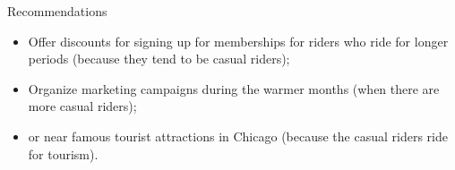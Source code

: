 \documentclass{beamer}
\begin{document}
\begin{frame}{Recommendations}
\begin{itemize}
    \item Offer discounts for signing up for memberships for riders who ride for longer periods (because they tend to be casual riders);
    \item Organize marketing campaigns during the warmer months (when there are more casual riders);
    \item or near famous tourist attractions in Chicago (because the casual riders ride for tourism).
\end{itemize}
\end{frame}
\end{document}
